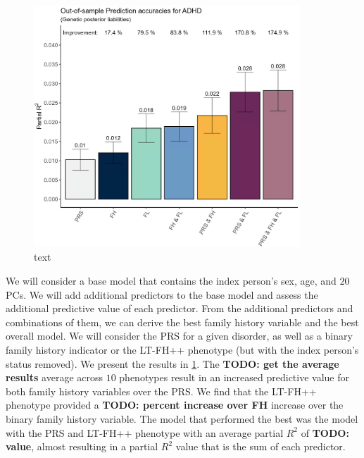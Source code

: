 \begin{figure}
	\includegraphics[width=10cm]{results/adhd_predictive_power.png}
	\caption[Out of sample prediction performance]{text}
	\label{fig:paper3:predictionResults}
\end{figure}
We will consider a base model that contains the index person's sex, age, and $ 20 $ PCs. We will add additional predictors to the base model and assess the additional predictive value of each predictor. From the additional predictors and combinations of them, we can derive the best family history variable and the best overall model. We will consider the PRS for a given disorder, as well as a binary family history indicator or the LT-FH++ phenotype (but with the index person's status removed). We present the results in \cref{fig:paper3:predictionResults}. The \textbf{TODO: get the average results} average across $ 10 $ phenotypes result in an increased predictive value for both family history variables over the PRS. We find that the LT-FH++ phenotype provided a \textbf{TODO: percent increase over FH} increase over the binary family history variable. The model that performed the best was the model with the PRS and LT-FH++ phenotype with an average partial $ R^2 $ of \textbf{TODO: value}, almost resulting in a partial $ R^2 $ value that is the sum of each predictor. 

